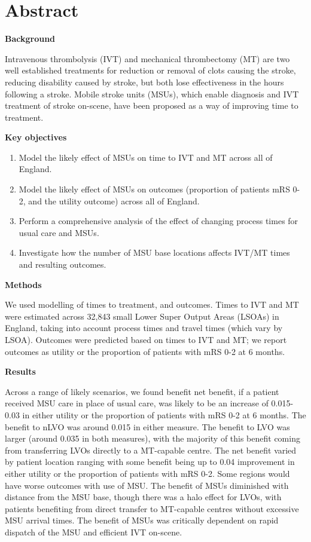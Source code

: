 \section*{Abstract}

\textbf{Background}

Intravenous thrombolysis (IVT) and mechanical thrombectomy (MT) are two well established treatments for reduction or removal of clots causing the stroke, reducing disability caused by stroke, but both lose effectiveness in the hours following a stroke. Mobile stroke units (MSUs), which enable diagnosis and IVT treatment of stroke on-scene, have been proposed as a way of improving time to treatment.

\textbf{Key objectives}

\begin{enumerate}
    \item Model the likely effect of MSUs on time to IVT and MT across all of England.
    \item Model the likely effect of MSUs on outcomes (proportion of patients mRS 0-2, and the utility outcome) across all of England.
    \item Perform a comprehensive analysis of the effect of changing process times for usual care and MSUs.
    \item Investigate how the number of MSU base locations affects IVT/MT times and resulting outcomes.
\end{enumerate}

\textbf{Methods}

We used modelling of times to treatment, and outcomes. Times to IVT and MT were estimated across 32,843 small Lower Super Output Areas (LSOAs) in England, taking into account process times and travel times (which vary by LSOA). Outcomes were predicted based on times to IVT and MT; we report outcomes as utility or the proportion of patients with mRS 0-2 at 6 months.

\textbf{Results}

Across a range of likely scenarios, we found benefit net benefit, if a patient received MSU care in place of usual care, was likely to be an increase of 0.015-0.03 in either utility or the proportion of patients with mRS 0-2 at 6 months. The benefit to nLVO was around 0.015 in either measure. The benefit to LVO was larger (around 0.035 in both measures), with the majority of this benefit coming from transferring LVOs directly to a MT-capable centre. The net benefit varied by patient location ranging with some benefit being up to 0.04 improvement in either utility or the proportion of patients with mRS 0-2. Some regions would have worse outcomes with use of MSU. The benefit of MSUs diminished with distance from the MSU base, though there was a halo effect for LVOs, with patients benefiting from direct transfer to MT-capable centres without excessive MSU arrival times. The benefit of MSUs was critically dependent on rapid dispatch of the MSU and efficient IVT on-scene.

